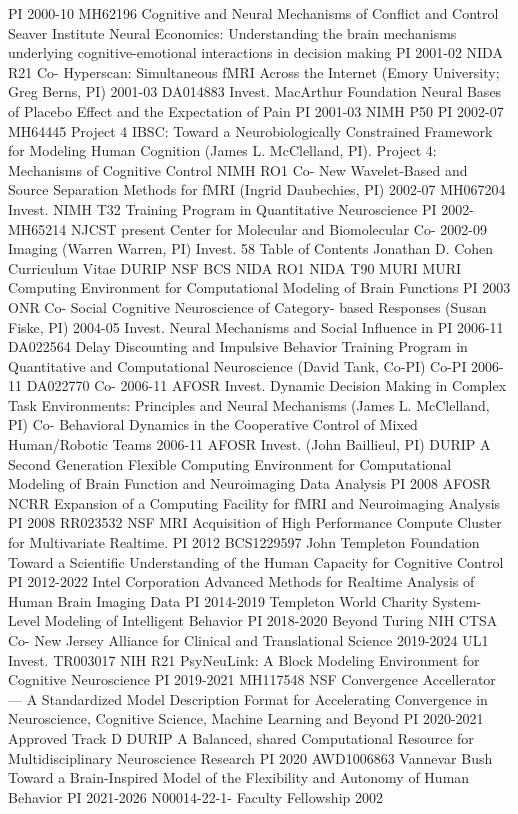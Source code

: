 \documentclass[10 pt]{article}
\begin{document}
PI 2000-10 MH62196
Cognitive and Neural Mechanisms of Conflict and Control
Seaver Institute Neural Economics: Understanding the brain mechanisms underlying cognitive-emotional interactions in decision making
PI 2001-02
NIDA R21 Co-
Hyperscan: Simultaneous fMRI Across the Internet (Emory University; Greg Berns, PI)
2001-03 DA014883
Invest.
MacArthur
Foundation
Neural Bases of Placebo Effect and the
Expectation of Pain
PI 2001-03
NIMH P50 PI
2002-07 MH64445
Project 4
IBSC: Toward a Neurobiologically Constrained Framework for Modeling Human Cognition (James L. McClelland, PI). Project 4: Mechanisms of Cognitive Control
NIMH RO1 Co-
New Wavelet-Based and Source Separation Methods for fMRI (Ingrid Daubechies, PI)
2002-07 MH067204
Invest.
NIMH T32 Training Program in Quantitative Neuroscience PI 2002-
MH65214
NJCST present
Center for Molecular and Biomolecular
Co-
2002-09
Imaging (Warren Warren, PI)
Invest.
58 Table of Contents
Jonathan D. Cohen Curriculum Vitae
DURIP NSF BCS NIDA RO1 NIDA T90 MURI MURI Computing Environment for Computational Modeling of Brain Functions
PI 2003 ONR
Co-
Social Cognitive Neuroscience of Category- based Responses (Susan Fiske, PI)
2004-05
Invest.
Neural Mechanisms and Social Influence in
PI 2006-11 DA022564
Delay Discounting and Impulsive Behavior
Training Program in Quantitative and Computational Neuroscience (David Tank, Co-PI)
Co-PI 2006-11 DA022770
Co-
2006-11 AFOSR
Invest.
Dynamic Decision Making in Complex Task Environments: Principles and Neural Mechanisms (James L. McClelland, PI)
Co-
Behavioral Dynamics in the Cooperative Control of Mixed Human/Robotic Teams
2006-11 AFOSR
Invest.
(John Baillieul, PI)
DURIP A Second Generation Flexible Computing Environment for Computational Modeling of Brain Function and Neuroimaging Data Analysis
PI 2008 AFOSR
NCRR Expansion of a Computing Facility for fMRI and Neuroimaging Analysis
PI 2008 RR023532
NSF MRI Acquisition of High Performance Compute Cluster for Multivariate Realtime.
PI 2012 BCS1229597
John Templeton Foundation Toward a Scientific Understanding of the Human Capacity for Cognitive Control
PI 2012-2022
Intel Corporation Advanced Methods for Realtime Analysis of Human Brain Imaging Data
PI 2014-2019
Templeton World Charity System-Level Modeling of Intelligent Behavior PI 2018-2020 Beyond Turing
NIH CTSA Co-
New Jersey Alliance for Clinical and Translational Science
2019-2024 UL1
Invest.
TR003017
NIH R21 PsyNeuLink: A Block Modeling Environment for Cognitive Neuroscience
PI 2019-2021 MH117548
NSF
Convergence Accellerator —
A Standardized Model Description Format for Accelerating Convergence in Neuroscience, Cognitive Science, Machine Learning and Beyond
PI 2020-2021 Approved
Track D
DURIP A Balanced, shared Computational Resource for Multidisciplinary Neuroscience Research
PI 2020 AWD1006863
Vannevar Bush
Toward a Brain-Inspired Model of the Flexibility and Autonomy of Human Behavior
PI 2021-2026 N00014-22-1-
Faculty Fellowship
2002
\end{document}

